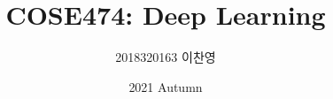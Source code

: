 

\title{COSE474: Deep Learning}
\author{2018320163 이찬영}
\date{2021 Autumn}


    \maketitle
    \tableofcontents
    \setimgdir

